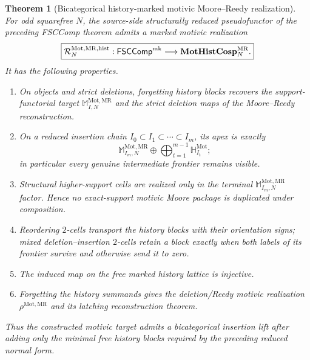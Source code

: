 \documentclass[11pt]{article}
\newtheorem{theorem}{Theorem}[section]
\theoremstyle{remark}
\newcommand{\Mot}{\mathrm{Mot}}
\newcommand{\MR}{\mathrm{MR}}
\providecommand{\FSCComp}{\mathsf{FSCComp}}
\begin{document}
\begin{theorem}[Bicategorical history-marked motivic Moore--Reedy realization]
\label{P2M-thm:v21-bicategorical-motivic-realization}
For odd squarefree $N$, the source-side structurally reduced pseudofunctor of
the preceding FSCComp theorem admits a marked motivic realization
\begin{equation}
 \boxed{
 \mathcal R_{N}^{\Mot,\MR,\mathrm{hist}}:
 \FSCComp^{\rm mk}
 \longrightarrow
 \mathbf{MotHistCosp}_{N}^{\MR}.}
\end{equation}
It has the following properties.
\begin{enumerate}[label=\textup{(\roman*)}]
\item On objects and strict deletions, forgetting history blocks recovers the
      support-functorial target $\mathbb M_{I,N}^{\Mot,\MR}$ and the strict
      deletion maps of the Moore--Reedy reconstruction.
\item On a reduced insertion chain
      $I_0\subset I_1\subset\cdots\subset I_m$, its apex is exactly
      \[
       \mathbb M_{I_m,N}^{\Mot,\MR}
       \oplus\bigoplus_{t=1}^{m-1}\mathbb H_{I_t}^{\Mot};
      \]
      in particular every genuine intermediate frontier remains visible.
\item Structural higher-support cells are realized only in the terminal
      $\mathbb M_{I_m,N}^{\Mot,\MR}$ factor.  Hence no exact-support motivic
      Moore package is duplicated under composition.
\item Reordering $2$-cells transport the history blocks with their orientation
      signs; mixed deletion--insertion $2$-cells retain a block exactly when
      both labels of its frontier survive and otherwise send it to zero.
\item The induced map on the free marked history lattice is injective.
\item Forgetting the history summands gives the deletion/Reedy motivic
      realization $\rho^{\Mot,\MR}$ and its latching reconstruction theorem.
\end{enumerate}
Thus the constructed motivic target admits a bicategorical insertion lift after
adding only the minimal free history blocks required by the preceding reduced
normal form.
\end{theorem}
\end{document}
